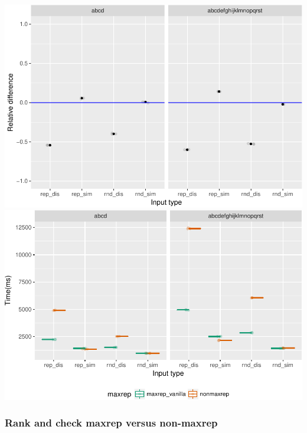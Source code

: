 \documentclass[]{article}
\begin{document}
\includegraphics{sea_2018_files/figure-latex/maxrep1_plot-1.pdf}
\includegraphics{sea_2018_files/figure-latex/maxrep1_plot-2.pdf}

\subsubsection{Rank and check maxrep versus
non-maxrep}\label{rank-and-check-maxrep-versus-non-maxrep}
\end{document}
